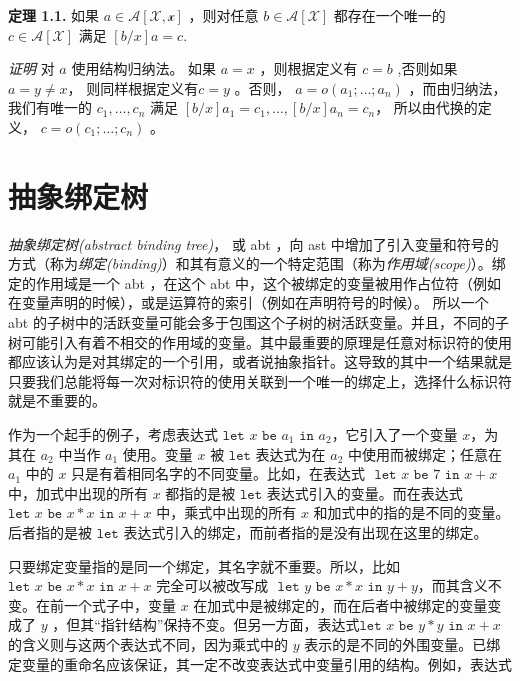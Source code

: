 \textbf{定理 1.1.} 如果 \(a\in \mathcal{A[X,x]}\) ，则对任意
\(b \in \mathcal{A[X]}\) 都存在一个唯一的 \(c\in \mathcal{A[X]}\) 满足
\([b/x]a=c\).

\emph{证明} 对 \(a\) 使用结构归纳法。 如果 \(a=x\) ，则根据定义有
\(c=b\) ,否则如果\(a=y\neq x\)， 则同样根据定义有\(c=y\) 。否则，
\(a=o(a_1;\dots;a_n)\) ，而由归纳法，我们有唯一的 \(c_1,\dots,c_n\) 满足
\([b/x]a_1=c_1,\dots,[b/x]a_n=c_n\)， 所以由代换的定义，
\(c=o(c_1;\dots;c_n)\) 。

\section{抽象绑定树}

\emph{抽象绑定树(abstract binding tree)}， 或 abt ，向 ast
中增加了引入变量和符号的方式（称为\emph{绑定(binding)}）和其有意义的一个特定范围（称为\emph{作用域(scope)}）。绑定的作用域是一个
abt ，在这个 abt
中，这个被绑定的变量被用作占位符（例如在变量声明的时候），或是运算符的索引（例如在声明符号的时候）。
所以一个 abt
的子树中的活跃变量可能会多于包围这个子树的树活跃变量。并且，不同的子树可能引入有着不相交的作用域的变量。其中最重要的原理是任意对标识符的使用都应该认为是对其绑定的一个引用，或者说抽象指针。这导致的其中一个结果就是只要我们总能将每一次对标识符的使用关联到一个唯一的绑定上，选择什么标识符就是不重要的。

作为一个起手的例子，考虑表达式
\(\texttt{let } x \texttt{ be } a_1 \texttt{ in } a_2\)，它引入了一个变量
\(x\)，为其在 \(a_2\) 中当作 \(a_1\) 使用。变量 \(x\) 被
\(\texttt{let}\) 表达式为在 \(a_2\) 中使用而被绑定；任意在 \(a_1\) 中的
\(x\) 只是有着相同名字的不同变量。比如，在表达式
\(\texttt{ let } x \texttt{ be } 7 \texttt{ in } x+x \)
中，加式中出现的所有 \(x\) 都指的是被 \(\texttt{let}\)
表达式引入的变量。而在表达式
\(\texttt{let } x \texttt{ be } x * x \texttt{ in } x+x \)
中，乘式中出现的所有 \(x\) 和加式中的指的是不同的变量。后者指的是被
\(\texttt{let}\) 表达式引入的绑定，而前者指的是没有出现在这里的绑定。

只要绑定变量指的是同一个绑定，其名字就不重要。所以，比如
\(\texttt{let } x\texttt{ be } x * x \texttt{ in } x+x\)
完全可以被改写成
\(\texttt{ let } y \texttt{ be } x * x \texttt{ in } y+y \)，而其含义不变。在前一个式子中，变量
\(x\) 在加式中是被绑定的，而在后者中被绑定的变量变成了 \(y\)
，但其``指针结构''保持不变。但另一方面，表达式\(\texttt{let } x\texttt{ be } y * y \texttt{ in } x+x\)
的含义则与这两个表达式不同，因为乘式中的 \(y\)
表示的是不同的外围变量。已绑定变量的重命名应该保证，其一定不改变表达式中变量引用的结构。例如，表达式


